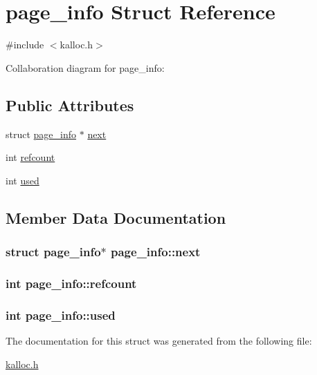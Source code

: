 \hypertarget{structpage__info}{}\section{page\+\_\+info Struct Reference}
\label{structpage__info}


{\ttfamily \#include $<$kalloc.\+h$>$}



Collaboration diagram for page\+\_\+info\+:
\subsection*{Public Attributes}
\begin{DoxyCompactItemize}
\item 
struct \hyperlink{structpage__info}{page\+\_\+info} $\ast$ \hyperlink{structpage__info_ad9b26cd23c4a059fdbf0f4b2f4363944}{next}
\item 
int \hyperlink{structpage__info_aa5d70e774275d72f2ecb55bb78ae6a9e}{refcount}
\item 
int \hyperlink{structpage__info_ae022785e7a59df9a0db49999218ddd2a}{used}
\end{DoxyCompactItemize}


\subsection{Member Data Documentation}
\subsubsection[{\texorpdfstring{next}{next}}]{\setlength{\rightskip}{0pt plus 5cm}struct {\bf page\+\_\+info}$\ast$ page\+\_\+info\+::next}\hypertarget{structpage__info_ad9b26cd23c4a059fdbf0f4b2f4363944}{}\label{structpage__info_ad9b26cd23c4a059fdbf0f4b2f4363944}
\subsubsection[{\texorpdfstring{refcount}{refcount}}]{\setlength{\rightskip}{0pt plus 5cm}int page\+\_\+info\+::refcount}\hypertarget{structpage__info_aa5d70e774275d72f2ecb55bb78ae6a9e}{}\label{structpage__info_aa5d70e774275d72f2ecb55bb78ae6a9e}
\subsubsection[{\texorpdfstring{used}{used}}]{\setlength{\rightskip}{0pt plus 5cm}int page\+\_\+info\+::used}\hypertarget{structpage__info_ae022785e7a59df9a0db49999218ddd2a}{}\label{structpage__info_ae022785e7a59df9a0db49999218ddd2a}


The documentation for this struct was generated from the following file\+:\begin{DoxyCompactItemize}
\item 
\hyperlink{kalloc_8h}{kalloc.\+h}\end{DoxyCompactItemize}
